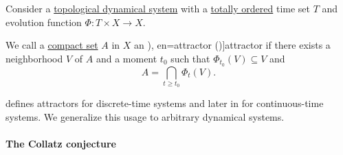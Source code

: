 \begin{definition}\label{def:dynamical_system_attractor}\mimprovised
  Consider a \hyperref[def:topological_dynamical_system]{topological dynamical system} with a \hyperref[def:totally_ordered_set]{totally ordered} time set \( T \) and evolution function \( \Phi: T \times X \to X \).

  We call a \hyperref[def:compact_space]{compact set} \( A \) in \( X \) an \term[ru=аттрактор (\cite[94]{Юмагулов2015ДинамическиеСистемы}), en=attractor (\cite[def. 3.1.1]{HasselblattKatok1995DynamicalSystems})]{attractor} if there exists a neighborhood \( V \) of \( A \) and a moment \( t_0 \) such that \( \Phi_{t_0}(V) \subseteq V \) and
  \begin{equation}\label{eq:def:dynamical_system_attractor}
    A = \bigcap_{t \geq t_0} \Phi_t(V).
  \end{equation}
\end{definition}
\begin{comments}
  \item {} defines attractors for discrete-time systems and later in \cite[169]{Юмагулов2015ДинамическиеСистемы} for continuous-time systems. We generalize this usage to arbitrary dynamical systems.
\end{comments}

\paragraph{The Collatz conjecture}

